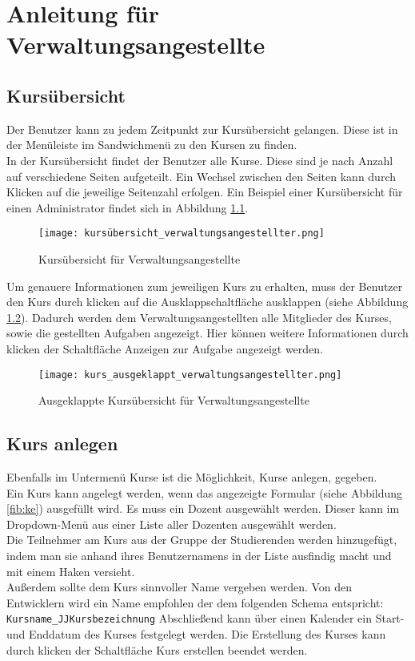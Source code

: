 
\chapter{Anleitung für Verwaltungsangestellte}
\label{sec:chap1}
\section{Kursübersicht}
Der Benutzer kann zu jedem Zeitpunkt zur Kursübersicht gelangen. Diese ist in der Menüleiste im Sandwichmenü zu den Kursen zu finden.\\
In der Kursübersicht findet der Benutzer alle Kurse. Diese sind je nach Anzahl auf verschiedene Seiten aufgeteilt. Ein Wechsel zwischen den Seiten kann durch Klicken auf die jeweilige Seitenzahl erfolgen. Ein Beispiel einer Kursübersicht für einen Administrator findet sich in Abbildung \ref{fib:kü}.

\begin{figure}[h]
\centering
\texttt{[image: kursübersicht\_verwaltungsangestellter.png]}
\caption{Kursübersicht für Verwaltungsangestellte}
\label{fib:kü}
\end{figure}

Um genauere Informationen zum jeweiligen Kurs zu erhalten, muss der Benutzer den Kurs durch klicken auf die Ausklappschaltfläche ausklappen (siehe Abbildung \ref{fib:kü-ausgeklappt}). Dadurch werden dem Verwaltungsangestellten alle Mitglieder des Kurses, sowie die gestellten Aufgaben angezeigt. Hier können weitere Informationen durch klicken der Schaltfläche \glqq Anzeigen\grqq{}\; zur Aufgabe angezeigt werden. 

\begin{figure}[h]
\centering
\texttt{[image: kurs\_ausgeklappt\_verwaltungsangestellter.png]}
\caption{Ausgeklappte Kursübersicht für Verwaltungsangestellte}
\label{fib:kü-ausgeklappt}
\end{figure}

\section{Kurs anlegen}
Ebenfalls im Untermenü Kurse ist die Möglichkeit, Kurse anlegen, gegeben.\\
Ein Kurs kann angelegt werden, wenn das angezeigte Formular (siehe Abbildung \ref{fib:ke}) ausgefüllt wird. Es muss ein Dozent ausgewählt werden. Dieser kann im Dropdown-Menü aus einer Liste aller Dozenten ausgewählt werden. \\
Die Teilnehmer am Kurs aus der Gruppe der Studierenden werden hinzugefügt, indem man sie anhand ihres Benutzernamens in der Liste ausfindig macht und mit einem Haken versieht. \\
Außerdem sollte dem Kurs sinnvoller Name vergeben werden. Von den Entwicklern wird ein Name empfohlen der dem folgenden Schema entspricht: \\
\verb/Kursname_JJKursbezeichnung/
Abschließend kann über einen Kalender ein Start- und Enddatum des Kurses festgelegt werden. 
Die Erstellung des Kurses kann durch klicken der Schaltfläche \glqq Kurs erstellen\grqq{} beendet werden.

